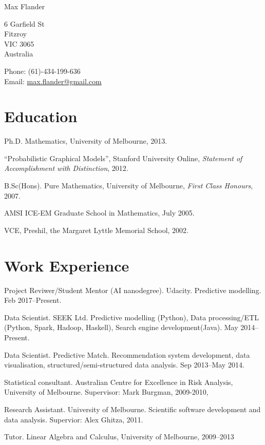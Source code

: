 \documentclass[10pt,a4paper]{article}
\def\name{Max Flander}
\renewenvironment{itemize}{
  \begin{list}{}{
    \setlength{\leftmargin}{1.5em}
    \setlength{\itemsep}{0.25em}
    \setlength{\parskip}{0pt}
    \setlength{\parsep}{0.25em}
  }
}{
  \end{list}
}
\begin{document}
{\huge \name}


\bigskip

\begin{minipage}[t]{0.4\textwidth}
  6 Garfield St \\
  Fitzroy \\
  VIC 3065 \\
  Australia
\end{minipage}
\begin{minipage}[t]{0.5\textwidth}
  Phone: (61)-434-199-636 \\
  Email: \href{mailto:max.flander@gmail.com}{max.flander@gmail.com} \\
\end{minipage}
\raggedright
\section*{Education}
\begin{itemize}
	\item Ph.D.  Mathematics, University of Melbourne, 2013.
	\item ``Probabilistic Graphical Models'', Stanford University Online, \emph{Statement of Accomplishment with Distinction}, 2012.
	\item B.Sc(Hons). Pure Mathematics, University of Melbourne, \emph{First Class Honours}, 2007. 
	\item AMSI ICE-EM Graduate School in Mathematics, July 2005. 
	\item VCE, Preshil, the Margaret Lyttle Memorial School, 2002.
\end{itemize}

\section*{Work Experience}

\begin{itemize}
	\item Project Reviwer/Student Mentor (AI nanodegree). Udacity. Predictive modelling. Feb 2017--Present.
	\item Data Scientist. SEEK Ltd. Predictive modelling (Python), Data processing/ETL (Python, Spark, Hadoop, Haskell), Search engine development(Java). May 2014--Present.
	\item Data Scientist. Predictive Match. Recommendation system development, data visualisation, structured/semi-structured data analysis. Sep 2013--May 2014.
	\item Statistical consultant. Australian Centre for Excellence in Risk Analysis, University of Melbourne. Supervisor: Mark Burgman, 2009-2010,
	\item Research Assistant. University of Melbourne. Scientific software development and data analysis. Supervior: Alex Ghitza, 2011.
	\item Tutor. Linear Algebra and Calculus, University of Melbourne, 2009--2013
\end{itemize}
\end{document}
